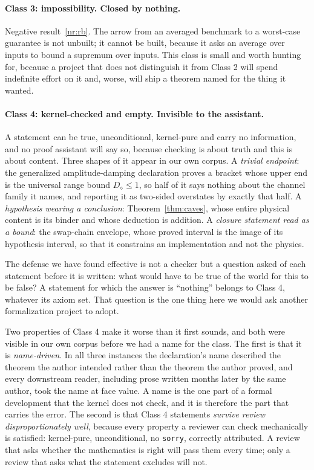 \documentclass[aps,pra,reprint,nofootinbib,superscriptaddress]{revtex4-2}
\theoremstyle{plain}
\theoremstyle{definition}
\theoremstyle{remark}
\newcommand{\ddist}{D_{\diamond}}
\begin{document}
\paragraph*{Class 3: impossibility. Closed by nothing.} Negative
result~\ref{nr:rb}. The arrow from an averaged benchmark to a worst-case
guarantee is not unbuilt; it cannot be built, because it asks an average
over inputs to bound a supremum over inputs. This class is small and
worth hunting for, because a project that does not distinguish it from
Class 2 will spend indefinite effort on it and, worse, will ship a
theorem named for the thing it wanted.

\paragraph*{Class 4: kernel-checked and empty. Invisible to the
assistant.} A statement can be true, unconditional, kernel-pure and
carry no information, and no proof assistant will say so, because
checking is about truth and this is about content. Three shapes of it
appear in our own corpus. A \emph{trivial endpoint}: the generalized
amplitude-damping declaration proves a bracket whose upper end is the
universal range bound $\ddist \le 1$, so half of it says nothing about
the channel family it names, and reporting it as two-sided overstates by
exactly that half. A \emph{hypothesis wearing a conclusion}:
Theorem~\ref{thm:caves}, whose entire physical content is its binder and
whose deduction is addition. A \emph{closure statement read as a bound}:
the swap-chain envelope, whose proved interval is the image of its
hypothesis interval, so that it constrains an implementation and not the
physics.

The defense we have found effective is not a checker but a question asked
of each statement before it is written: what would have to be true of the
world for this to be false? A statement for which the answer is
``nothing'' belongs to Class 4, whatever its axiom set. That question is
the one thing here we would ask another formalization project to adopt.

Two properties of Class 4 make it worse than it first sounds, and both
were visible in our own corpus before we had a name for the class. The
first is that it is \emph{name-driven}. In all three instances the
declaration's name described the theorem the author intended rather than
the theorem the author proved, and every downstream reader, including
prose written months later by the same author, took the name at face
value. A name is the one part of a formal development that the kernel
does not check, and it is therefore the part that carries the error. The
second is that Class 4 statements \emph{survive review disproportionately
well}, because every property a reviewer can check mechanically is
satisfied: kernel-pure, unconditional, no \texttt{sorry}, correctly
attributed. A review that asks whether the mathematics is right will pass
them every time; only a review that asks what the statement excludes will
not.
\end{document}

